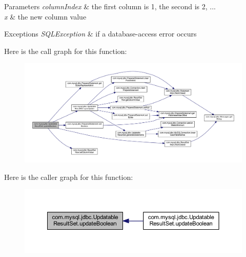 \begin{DoxyParams}{Parameters}
{\em column\+Index} & the first column is 1, the second is 2, ... \\
\hline
{\em x} & the new column value\\
\hline
\end{DoxyParams}

\begin{DoxyExceptions}{Exceptions}
{\em S\+Q\+L\+Exception} & if a database-\/access error occurs \\
\hline
\end{DoxyExceptions}
Here is the call graph for this function\+:
\nopagebreak
\begin{figure}[H]
\begin{center}
\leavevmode
\includegraphics[width=350pt]{classcom_1_1mysql_1_1jdbc_1_1_updatable_result_set_ad7bcfc97b47f3037e44a2b4271a92f61_cgraph}
\end{center}
\end{figure}
Here is the caller graph for this function\+:
\nopagebreak
\begin{figure}[H]
\begin{center}
\leavevmode
\includegraphics[width=350pt]{classcom_1_1mysql_1_1jdbc_1_1_updatable_result_set_ad7bcfc97b47f3037e44a2b4271a92f61_icgraph}
\end{center}
\end{figure}
\mbox{\label{classcom_1_1mysql_1_1jdbc_1_1_updatable_result_set_a5070cb2945792ee2e9f66f659df8b38a}} 
